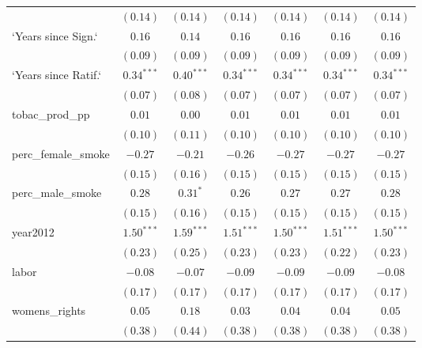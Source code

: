 \begin{table}[!h]
\begin{center}
\begin{tabular}{l c c c c c c }
                        & $(0.14)$     & $(0.14)$     & $(0.14)$     & $(0.14)$     & $(0.14)$     & $(0.14)$     \\
`Years since Sign.`     & $0.16$       & $0.14$       & $0.16$       & $0.16$       & $0.16$       & $0.16$       \\
                        & $(0.09)$     & $(0.09)$     & $(0.09)$     & $(0.09)$     & $(0.09)$     & $(0.09)$     \\
`Years since Ratif.`    & $0.34^{***}$ & $0.40^{***}$ & $0.34^{***}$ & $0.34^{***}$ & $0.34^{***}$ & $0.34^{***}$ \\
                        & $(0.07)$     & $(0.08)$     & $(0.07)$     & $(0.07)$     & $(0.07)$     & $(0.07)$     \\
tobac\_prod\_pp         & $0.01$       & $0.00$       & $0.01$       & $0.01$       & $0.01$       & $0.01$       \\
                        & $(0.10)$     & $(0.11)$     & $(0.10)$     & $(0.10)$     & $(0.10)$     & $(0.10)$     \\
perc\_female\_smoke     & $-0.27$      & $-0.21$      & $-0.26$      & $-0.27$      & $-0.27$      & $-0.27$      \\
                        & $(0.15)$     & $(0.16)$     & $(0.15)$     & $(0.15)$     & $(0.15)$     & $(0.15)$     \\
perc\_male\_smoke       & $0.28$       & $0.31^{*}$   & $0.26$       & $0.27$       & $0.27$       & $0.28$       \\
                        & $(0.15)$     & $(0.16)$     & $(0.15)$     & $(0.15)$     & $(0.15)$     & $(0.15)$     \\
year2012                & $1.50^{***}$ & $1.59^{***}$ & $1.51^{***}$ & $1.50^{***}$ & $1.51^{***}$ & $1.50^{***}$ \\
                        & $(0.23)$     & $(0.25)$     & $(0.23)$     & $(0.23)$     & $(0.22)$     & $(0.23)$     \\
labor                   & $-0.08$      & $-0.07$      & $-0.09$      & $-0.09$      & $-0.09$      & $-0.08$      \\
                        & $(0.17)$     & $(0.17)$     & $(0.17)$     & $(0.17)$     & $(0.17)$     & $(0.17)$     \\
womens\_rights          & $0.05$       & $0.18$       & $0.03$       & $0.04$       & $0.04$       & $0.05$       \\
                        & $(0.38)$     & $(0.44)$     & $(0.38)$     & $(0.38)$     & $(0.38)$     & $(0.38)$     \\

\end{tabular}
\end{center}
\end{table}
